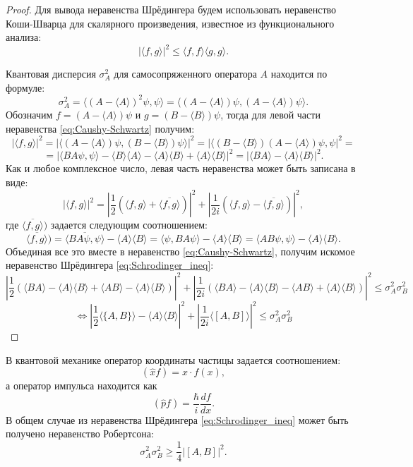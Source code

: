 \documentclass[%
master,         %
subf,           %
href,           %
colorlinks=true %
]{disser}
\numberwithin{equation}{section}
\numberwithin{figure}{section}
\begin{document}
\begin{proof}
Для вывода неравенства Шрёдингера будем использовать неравенство Коши-Шварца для скалярного произведения, известное из функционального анализа:
\begin{equation}
|\langle f, g\rangle |^2 \leq \langle f, f\rangle \langle g, g\rangle. \label{eq:Caushy-Schwartz}
\end{equation}

Квантовая дисперсия $\sigma^2_A$ для самосопряженного оператора $A$ находится по формуле:
\[
\sigma_A^2 = \langle (A - \langle A\rangle)^2\psi, \psi\rangle = \langle  (A - \langle A\rangle)\psi,  (A - \langle A\rangle)\psi\rangle.
\]
Обозначим $f = (A - \langle A\rangle)\psi$ и $g = (B - \langle B\rangle)\psi$, тогда для левой части неравенства \eqref{eq:Caushy-Schwartz} получим:
\[
|\langle f, g\rangle |^2 = |\langle (A - \langle A\rangle)\psi, (B - \langle B\rangle)\psi\rangle |^2 = |\langle (B - \langle B\rangle)(A - \langle A\rangle)\psi, \psi |^2 = 
\]
\[
= | \langle BA\psi, \psi\rangle - \langle B\rangle\langle A\rangle - \langle A\rangle \langle B\rangle + \langle A\rangle\langle B\rangle |^2 = | \langle BA\rangle - \langle A\rangle\langle B\rangle |^2.
\]
Как и любое комплексное число, левая часть неравенства может быть записана в виде:
\[
|\langle f, g\rangle |^2 = \left| \frac{1}{2}(\langle f, g\rangle + \overline{\langle f, g\rangle})\right|^2 + \left| \frac{1}{2i}(\langle f, g\rangle - \overline{\langle f, g\rangle})\right|^2, 
\]
где $\overline{\langle f, g\rangle})$ задается следующим соотношением:
\[
\overline{\langle f, g\rangle}) = \overline{\langle BA\psi, \psi\rangle} - \langle A\rangle\langle B\rangle = \langle\psi, BA\psi\rangle - \langle A\rangle\langle B\rangle = \langle AB\psi, \psi\rangle - \langle A\rangle\langle B\rangle.
\]
Объединая все это вместе в неравенство \eqref{eq:Caushy-Schwartz}, получим искомое неравенство Шрёдингера \eqref{eq:Schrodinger_ineq}:
\[
\left| \frac{1}{2}(\langle BA\rangle - \langle A\rangle\langle B\rangle + \langle AB\rangle - \langle A\rangle\langle B\rangle)\right|^2 + \left| \frac{1}{2i}(\langle BA\rangle - \langle A\rangle\langle B\rangle - \langle AB\rangle + \langle A\rangle\langle B\rangle)\right|^2 \leq \sigma_A^2\sigma_B^2
\]
\[
\Leftrightarrow \left| \frac{1}{2}\langle\{A, B\}\rangle - \langle A\rangle\langle B\rangle \right|^2 + \left| \frac{1}{2i}\langle [A, B]\rangle\right|^2 \leq \sigma_A^2\sigma_B^2
\]
\end{proof}

В квантовой механике оператор координаты частицы задается соотношением:
\[
(\hat{x}f) = x\cdot f(x),
\]
а оператор импульса находится как
\[
(\hat{p}f) = \frac{\hbar}{i}\frac{df}{dx}.
\]
В общем случае из неравенства Шрёдингера  \eqref{eq:Schrodinger_ineq} может быть получено неравенство Робертсона:
\[
\sigma_A^2\sigma_B^2 \geq \frac{1}{4}|[A, B]|^2.
\]
\end{document}
